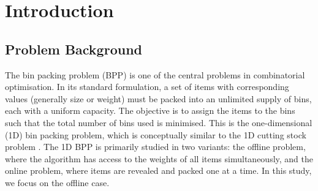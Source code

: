 \documentclass[11pt]{article}
\begin{document}
\begin{abstract}
The results show that both LLMs produced functionally correct code for six of the seven algorithms, deviating from the specified paradigm only on FDO, and frequently matched or exceeded human-level performance. Anthropic's Claude Opus 4.6 achieved the lowest weighted average deviation from the known optimal on four of the seven algorithms, incorporating design choices absent from the human baselines---notably a dynamic cooling schedule for Simulated Annealing and an iterative bin-reduction formulation for Tabu Search. The human implementations retained an advantage on the Genetic Algorithm and Variable Neighbourhood Search, where the human's choice of bin-level encoding and exhaustive local search respectively outperformed the alternative approaches adopted by both LLMs. OpenAI's GPT-5.2 exhibited higher variance, achieving the strongest result on ACO but struggling on SA due to a fundamental objective function flaw that rendered the search almost entirely uninformative despite producing syntactically correct and executable code. Neither model produced a faithful adaptation of the Fitness Dependent Optimizer, instead defaulting to more familiar algorithmic paradigms. These findings suggest that flagship LLMs are now capable of producing competitive metaheuristic implementations for well-studied combinatorial problems, but remain susceptible to subtle reasoning errors that are difficult to detect through automated correctness testing alone.
\end{abstract}

\section{Introduction}

\subsection{Problem Background}
The bin packing problem (BPP) is one of the central problems in combinatorial optimisation. In its standard formulation, a set of items with corresponding values (generally size or weight) must be packed into an unlimited supply of bins, each with a uniform capacity. The objective is to assign the items to the bins such that the total number of bins used is minimised. This is the one-dimensional (1D) bin packing problem, which is conceptually similar to the 1D cutting stock problem \cite{maxence}. The 1D BPP is primarily studied in two variants: the offline problem, where the algorithm has access to the weights of all items simultaneously, and the online problem, where items are revealed and packed one at a time. In this study, we focus on the offline case.
\end{document}
